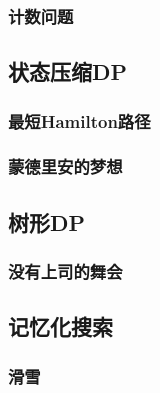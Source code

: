 \documentclass[10pt,a4paper]{article}
\begin{document}
\subsubsection{计数问题}

\subsection{状态压缩DP}
\subsubsection{最短Hamilton路径}

\subsubsection{蒙德里安的梦想}

\subsection{树形DP}
\subsubsection{没有上司的舞会}

\subsection{记忆化搜索}
\subsubsection{滑雪}

\end{document}

